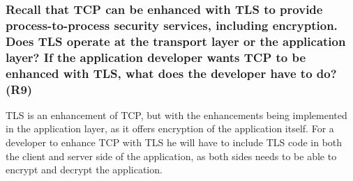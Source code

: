 \subsubsection{Recall that TCP can be enhanced with TLS to provide process-to-process security services, including encryption. Does TLS operate at the transport layer or the application layer? If the application developer wants TCP to be enhanced with TLS, what does the developer have to do? (R9)}

TLS is an enhancement of TCP, but with the enhancements being implemented in the application layer, as it offers encryption of the application itself. For a developer to enhance TCP with TLS he will have to include TLS code in both the client and server side of the application, as both sides needs to be able to encrypt and decrypt the application.




















